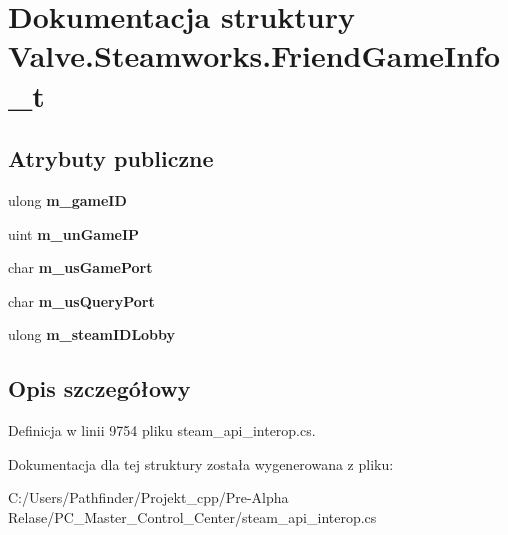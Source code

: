 \hypertarget{struct_valve_1_1_steamworks_1_1_friend_game_info__t}{}\section{Dokumentacja struktury Valve.\+Steamworks.\+Friend\+Game\+Info\+\_\+t}
\label{struct_valve_1_1_steamworks_1_1_friend_game_info__t}
\subsection*{Atrybuty publiczne}
\begin{DoxyCompactItemize}
\item 
\mbox{\label{struct_valve_1_1_steamworks_1_1_friend_game_info__t_a125da0694a5720ec6a8973b4211fdf8e}} 
ulong {\bfseries m\+\_\+game\+ID}
\item 
\mbox{\label{struct_valve_1_1_steamworks_1_1_friend_game_info__t_ab059035d8e16b3407d79748a73f50486}} 
uint {\bfseries m\+\_\+un\+Game\+IP}
\item 
\mbox{\label{struct_valve_1_1_steamworks_1_1_friend_game_info__t_a8f0ad3060aaaf1641abf8a5e69676889}} 
char {\bfseries m\+\_\+us\+Game\+Port}
\item 
\mbox{\label{struct_valve_1_1_steamworks_1_1_friend_game_info__t_a1c6b16ca4cc246c48663d65a4afce4b3}} 
char {\bfseries m\+\_\+us\+Query\+Port}
\item 
\mbox{\label{struct_valve_1_1_steamworks_1_1_friend_game_info__t_a7c642b0506bfdd3a098cb933e989fffe}} 
ulong {\bfseries m\+\_\+steam\+I\+D\+Lobby}
\end{DoxyCompactItemize}


\subsection{Opis szczegółowy}


Definicja w linii 9754 pliku steam\+\_\+api\+\_\+interop.\+cs.



Dokumentacja dla tej struktury została wygenerowana z pliku\+:\begin{DoxyCompactItemize}
\item 
C\+:/\+Users/\+Pathfinder/\+Projekt\+\_\+cpp/\+Pre-\/\+Alpha Relase/\+P\+C\+\_\+\+Master\+\_\+\+Control\+\_\+\+Center/steam\+\_\+api\+\_\+interop.\+cs\end{DoxyCompactItemize}
